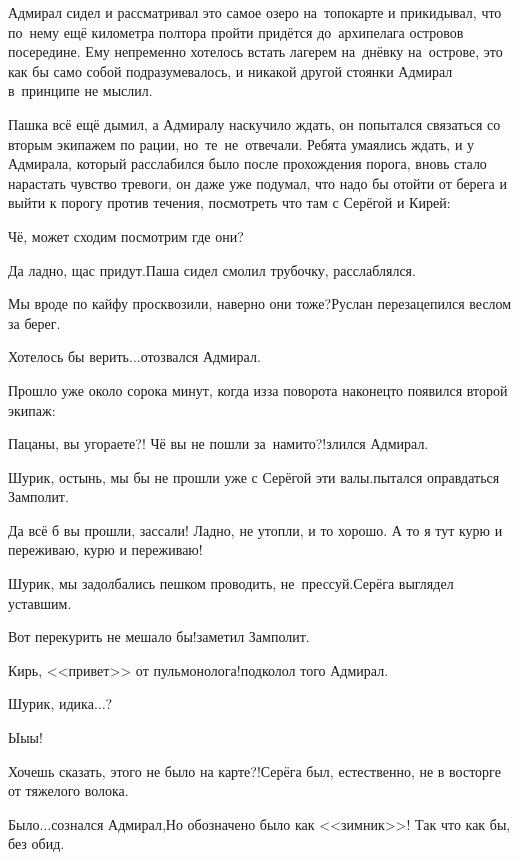 Адмирал сидел и рассматривал это самое озеро на~топокарте и прикидывал, что по~нему ещё километра полтора пройти придётся до~архипелага островов посередине. Ему непременно хотелось встать лагерем на~днёвку на~острове, это как бы само собой подразумевалось, и никакой другой стоянки Адмирал в~принципе не мыслил.

Пашка всё ещё дымил, а Адмиралу наскучило ждать, он попытался связаться со вторым экипажем по рации, но~те~не~отвечали. Ребята умаялись ждать, и у Адмирала, который расслабился было после прохождения порога, вновь стало нарастать чувство тревоги, он даже уже подумал, что надо бы отойти от берега и выйти к порогу против течения, посмотреть что там с Серёгой и Кирей:

\diagdash Чё, может сходим посмотрим где они?

\diagdash Да ладно, щас придут.\mdash Паша сидел смолил трубочку, расслаблялся.

\diagdash Мы вроде по кайфу просквозили, наверно они тоже?\mdash Руслан перезацепился веслом за берег.

\diagdash Хотелось бы верить$\ldots$\mdash отозвался Адмирал.

Прошло уже около сорока минут, когда из\sdash за поворота наконец\sdash то появился второй экипаж:

\diagdash Пацаны, вы угораете?! Чё вы не пошли за~нами\sdash то?!\mdash злился Адмирал.

\diagdash Шурик, остынь, мы бы не прошли уже с Серёгой эти валы.\mdash пытался оправдаться Замполит.

\diagdash Да всё б вы прошли, зассали! Ладно, не утопли, и то хорошо. А то я тут курю и переживаю, курю и переживаю!

\diagdash Шурик, мы задолбались пешком проводить, не~прессуй.\mdash Серёга выглядел уставшим.

\diagdash Вот перекурить не мешало бы!\mdash заметил Замполит.

\diagdash Кирь, <<привет>> от пульмонолога!\mdash подколол того Адмирал.

\diagdash Шурик, иди\sdash ка$\ldots$?

\diagdash Ы\sdash ы\sdash ы!

\diagdash Хочешь сказать, этого не было на карте?!\mdash Серёга был, естественно, не в восторге от тяжелого волока.

\diagdash Было$\ldots$\mdash сознался Адмирал,\mdash Но обозначено было как <<зимник>>! Так что как бы, без обид.

